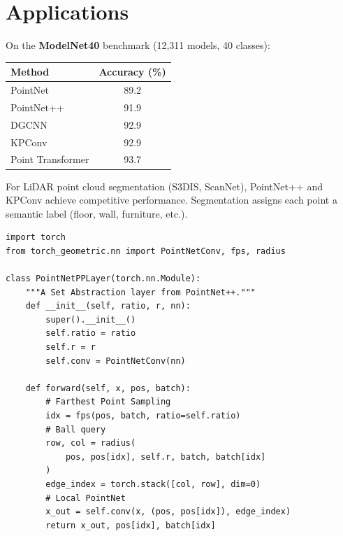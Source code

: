 \section{Applications}
\label{sec:applications_pc}

\begin{example}
On the \textbf{ModelNet40} benchmark (12,311 models, 40 classes):
\begin{center}
\begin{tabular}{lc}
\toprule
\textbf{Method} & \textbf{Accuracy (\%)} \\
\midrule
PointNet & 89.2 \\
PointNet++ & 91.9 \\
DGCNN & 92.9 \\
KPConv & 92.9 \\
Point Transformer & 93.7 \\
\bottomrule
\end{tabular}
\end{center}
\end{example}

\begin{example}
For LiDAR point cloud segmentation (S3DIS, ScanNet), PointNet++
and KPConv achieve competitive performance. Segmentation assigns
each point a semantic label (floor, wall, furniture, etc.).
\end{example}

\begin{verbatim}
import torch
from torch_geometric.nn import PointNetConv, fps, radius

class PointNetPPLayer(torch.nn.Module):
    """A Set Abstraction layer from PointNet++."""
    def __init__(self, ratio, r, nn):
        super().__init__()
        self.ratio = ratio
        self.r = r
        self.conv = PointNetConv(nn)

    def forward(self, x, pos, batch):
        # Farthest Point Sampling
        idx = fps(pos, batch, ratio=self.ratio)
        # Ball query
        row, col = radius(
            pos, pos[idx], self.r, batch, batch[idx]
        )
        edge_index = torch.stack([col, row], dim=0)
        # Local PointNet
        x_out = self.conv(x, (pos, pos[idx]), edge_index)
        return x_out, pos[idx], batch[idx]
\end{verbatim}

